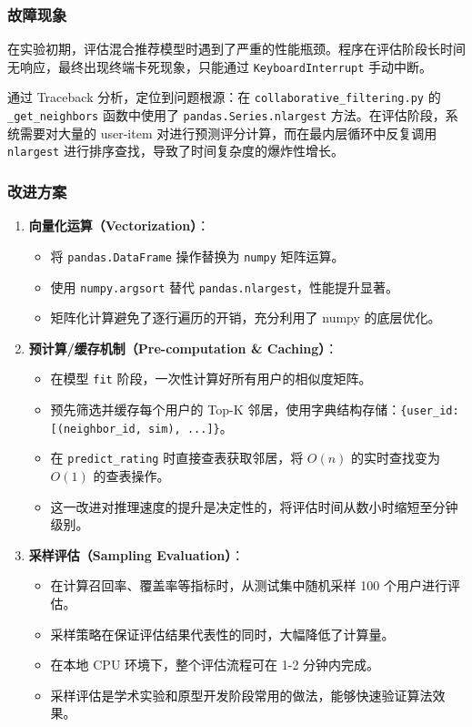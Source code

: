 \documentclass[a4paper]{article}
\begin{document}
\subsubsection{故障现象}

在实验初期，评估混合推荐模型时遇到了严重的性能瓶颈。程序在评估阶段长时间无响应，最终出现终端卡死现象，只能通过 \texttt{KeyboardInterrupt} 手动中断。

通过 Traceback 分析，定位到问题根源：在 \texttt{collaborative\_filtering.py} 的 \texttt{\_get\_neighbors} 函数中使用了 \texttt{pandas.Series.nlargest} 方法。在评估阶段，系统需要对大量的 user-item 对进行预测评分计算，而在最内层循环中反复调用 \texttt{nlargest} 进行排序查找，导致了时间复杂度的爆炸性增长。

\subsubsection{改进方案}
\begin{enumerate}
    \item \textbf{向量化运算（Vectorization）}：
    \begin{itemize}
        \item 将 \texttt{pandas.DataFrame} 操作替换为 \texttt{numpy} 矩阵运算。
        \item 使用 \texttt{numpy.argsort} 替代 \texttt{pandas.nlargest}，性能提升显著。
        \item 矩阵化计算避免了逐行遍历的开销，充分利用了 numpy 的底层优化。
    \end{itemize}
    
    \item \textbf{预计算/缓存机制（Pre-computation \& Caching）}：
    \begin{itemize}
        \item 在模型 \texttt{fit} 阶段，一次性计算好所有用户的相似度矩阵。
        \item 预先筛选并缓存每个用户的 Top-K 邻居，使用字典结构存储：\texttt{\{user\_id: [(neighbor\_id, sim), ...]\}}。
        \item 在 \texttt{predict\_rating} 时直接查表获取邻居，将 $O(n)$ 的实时查找变为 $O(1)$ 的查表操作。
        \item 这一改进对推理速度的提升是决定性的，将评估时间从数小时缩短至分钟级别。
    \end{itemize}
    
    \item \textbf{采样评估（Sampling Evaluation）}：
    \begin{itemize}
        \item 在计算召回率、覆盖率等指标时，从测试集中随机采样 100 个用户进行评估。
        \item 采样策略在保证评估结果代表性的同时，大幅降低了计算量。
        \item 在本地 CPU 环境下，整个评估流程可在 1-2 分钟内完成。
        \item 采样评估是学术实验和原型开发阶段常用的做法，能够快速验证算法效果。
    \end{itemize}
\end{enumerate}
\end{document}
